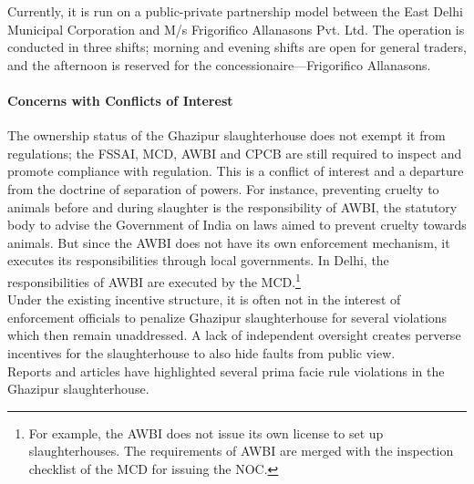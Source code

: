 \documentclass[a4paper, 12pt]{article}
\begin{document}
Currently, it is run on a public-private partnership model between the East Delhi Municipal Corporation and M/s Frigorifico Allanasons Pvt. Ltd. The operation is conducted in three shifts; morning and evening shifts are open for general traders, and the afternoon is reserved for the concessionaire—Frigorifico Allanasons.\\

\paragraph{Concerns with Conflicts of Interest}

The ownership status of the Ghazipur slaughterhouse does not exempt it from regulations; the FSSAI, MCD, AWBI and CPCB are still required to inspect and promote compliance with regulation. This is a conflict of interest and a departure from the doctrine of separation of powers. For instance, preventing cruelty to animals before and during slaughter is the responsibility of AWBI, the statutory body to advise the Government of India on laws aimed to prevent cruelty towards animals. But since the AWBI does not have its own enforcement mechanism, it executes its responsibilities through local governments. In Delhi, the responsibilities of AWBI are executed by the MCD.\footnote{ For example, the AWBI does not issue its own license to set up slaughterhouses. The requirements of AWBI are merged with the inspection checklist of the MCD for issuing the NOC.}\\

Under the existing incentive structure, it is often not in the interest of enforcement officials to penalize Ghazipur slaughterhouse for several violations which then remain unaddressed. A lack of independent oversight creates perverse incentives for the slaughterhouse to also hide faults from public view. \\

Reports and articles have highlighted several prima facie rule violations in the Ghazipur slaughterhouse. \\
\end{document}
